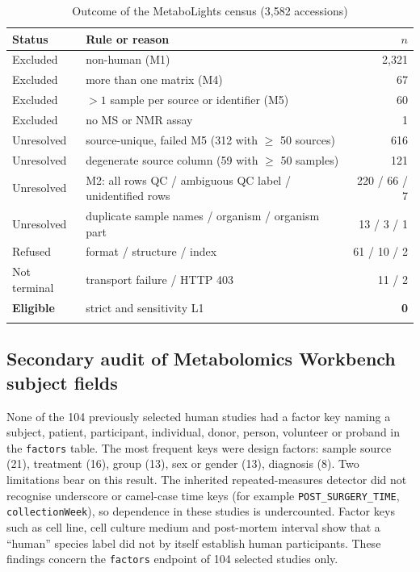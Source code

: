 \begin{table}[h]
\caption{Outcome of the MetaboLights census (3,582 accessions)}\label{tab:census}
\begin{tabular*}{\textwidth}{@{\extracolsep\fill}llr}
\toprule
Status & Rule or reason & $n$ \\
\midrule
Excluded & non-human (M1) & 2,321 \\
Excluded & more than one matrix (M4) & 67 \\
Excluded & $>1$ sample per source or identifier (M5) & 60 \\
Excluded & no MS or NMR assay & 1 \\
Unresolved & source-unique, failed M5 (312 with $\ge$ 50 sources) & 616 \\
Unresolved & degenerate source column (59 with $\ge$ 50 samples) & 121 \\
Unresolved & M2: all rows QC / ambiguous QC label / unidentified rows & 220 / 66 / 7 \\
Unresolved & duplicate sample names / organism / organism part & 13 / 3 / 1 \\
Refused & format / structure / index & 61 / 10 / 2 \\
Not terminal & transport failure / HTTP 403 & 11 / 2 \\
\textbf{Eligible} & strict and sensitivity L1 & \textbf{0} \\
\botrule
\end{tabular*}
\end{table}

\subsection{Secondary audit of Metabolomics Workbench subject fields}\label{sec:res-workbench}

None of the 104 previously selected human studies had a factor key naming a subject, patient, participant, individual, donor, person,
volunteer or proband in the \texttt{factors} table. The most frequent keys were design factors: sample source (21),
treatment (16), group (13), sex or gender (13), diagnosis (8). Two limitations bear on this result. The inherited
repeated-measures detector did not recognise underscore or camel-case time keys (for example
\texttt{POST\_SURGERY\_TIME}, \texttt{collectionWeek}), so dependence in these studies is undercounted. Factor keys
such as cell line, cell culture medium and post-mortem interval show that a ``human'' species label did not by itself
establish human participants. These findings concern the \texttt{factors} endpoint of 104 selected studies only.

